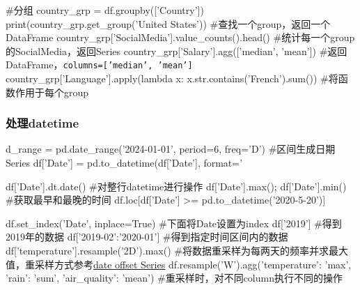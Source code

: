 \begin{codeblock}[language=python, caption={Perform statistical operations using DataFrame}]
        #分组
        country_grp = df.groupby(['Country'])
        print(country_grp.get_group('United States')) #查找一个group，返回一个DataFrame
        country_grp['SocialMedia'].value_counts().head() 
            #统计每一个group的SocialMedia，返回Series
        country_grp['Salary'].agg(['median', 'mean']) 
            #返回DataFrame，\texttt{columns=['median', 'mean']}
        country_grp['Language'].apply(lambda x: x.str.contains('French').sum())
            #将函数作用于每个group
      \end{codeblock}

    \subsubsection{处理datetime}
      \begin{codeblock}[language=python, caption={datetime in pandas}]
        d_range = pd.date_range('2024-01-01', period=6, freq='D') #区间生成日期Series
        df['Date'] = pd.to_datetime(df['Date'], format='%

        df['Date'].dt.date() #对整行datetime进行操作
        df['Date'].max(); df['Date'].min() #获取最早和最晚的时间
        df.loc[df['Date'] >= pd.to_datetime('2020-5-20')]

        df.set_index('Date', inplace=True) #下面将Date设置为index
        df['2019'] #得到2019年的数据
        df['2019-02':'2020-01'] #得到指定时间区间内的数据
        df['temperature'].resample('2D').max() 
            #将数据重采样为每两天的频率并求最大值，重采样方式参考\href{https://pandas.pydata.org/docs/user_guide/timeseries.html\#dateoffset-objects}{\underline{{date offset Series}}}
        df.resample('W').agg({'temperature': 'max', 'rain': 'sum', 'air_quality': 'mean'}) 
            #重采样时，对不同column执行不同的操作
      \end{codeblock}

